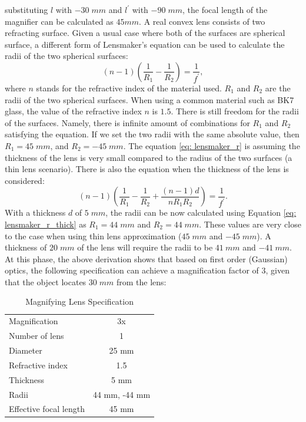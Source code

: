 substituting $l$ with $-30 \; mm$ and $l^\prime$ with $-90 \; mm$, the focal length of the magnifier can be calculated as $45 mm$. A real convex lens consists of two refracting surface. Given a usual case where both of the surfaces are spherical surface, a different form of Lensmaker's equation can be used to calculate the radii of the two spherical surfaces:
\begin{equation} \label{eq: lensmaker_r}
    (n-1)(\frac{1}{R_1} - \frac{1}{R_2}) = \frac{1}{f^\prime},
\end{equation}
where $n$ stands for the refractive index of the material used. $R_1$ and $R_2$ are the radii of the two spherical surfaces. When using a common material such as BK7 glass, the value of the refractive index $n$ is $1.5$. There is still freedom for the radii of the surfaces. Namely, there is infinite amount of combinations for $R_1$ and $R_2$ satisfying the equation. If we set the two radii with the same absolute value, then $R_1 = 45 \; mm$, and $R_2 = -45 \; mm$. 
The equation \ref{eq: lensmaker_r} is assuming the thickness of the lens is very small compared to the radius of the two surfaces (a thin lens scenario). There is also the equation when the thickness of the lens is considered:
\begin{equation} \label{eq: lensmaker_r_thick}
    (n-1)\left( \frac{1}{R_1} - \frac{1}{R_2} + \frac{(n-1)d}{nR_1R_2} \right) = \frac{1}{f^\prime}  .
\end{equation}
With a thickness $d$ of $5 \; mm$, the radii can be now calculated using Equation \ref{eq: lensmaker_r_thick} as $R_1 =  44 \; mm$ and $R_2 = 44 \; mm$. These values are very close to the case when using thin lens approximation ($45 \; mm$ and $-45 \; mm$). A thickness of $20 \; mm$ of the lens will require the radii to be $41 \ mm$ and $-41 \ mm$.
At this phase, the above derivation shows that based on first order (Gaussian) optics, the following specification can achieve a magnification factor of $3$, given that the object locates $30 \; mm$ from the lens:

\begin{table}[h!]
    \centering
    \captionsetup{justification=centering}
    \caption{Magnifying Lens Specification}
    \label{magnifying lens specs}
    \vspace{-1em}
    \begin{tabular}{ p{15em}  c }
    \hline 
    Magnification & 3x\\ 
    Number of lens & 1\\ 
    Diameter & 25 mm\\ 
    Refractive index & 1.5\\ 
    Thickness & 5 mm\\ 
    Radii & 44 mm, -44 mm\\
    Effective focal length & 45 mm\\
    \hline
    \end{tabular}
\end{table}

